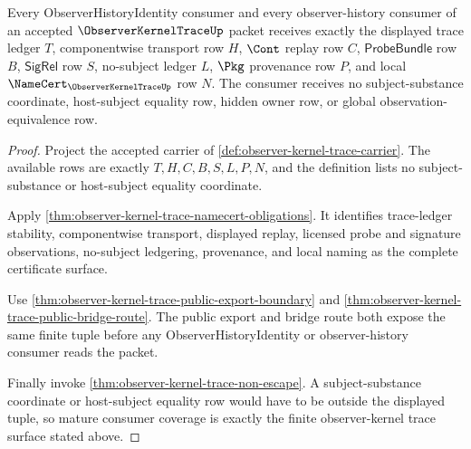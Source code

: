 \begin{theorem}
\label{thm:observer-kernel-trace-mature-consumer-coverage}
Every ObserverHistoryIdentity consumer and every observer-history consumer of an accepted $\ObserverKernelTraceUp$ packet receives exactly the displayed trace ledger $T$, componentwise transport row $H$, $\Cont$ replay row $C$, $\mathsf{ProbeBundle}$ row $B$, $\mathsf{SigRel}$ row $S$, no-subject ledger $L$, $\Pkg$ provenance row $P$, and local $\NameCert_{\ObserverKernelTraceUp}$ row $N$. The consumer receives no subject-substance coordinate, host-subject equality row, hidden owner row, or global observation-equivalence row.
\end{theorem}
\begin{proof}
Project the accepted carrier of \autoref{def:observer-kernel-trace-carrier}. The available rows are exactly $T,H,C,B,S,L,P,N$, and the definition lists no subject-substance or host-subject equality coordinate.

Apply \autoref{thm:observer-kernel-trace-namecert-obligations}. It identifies trace-ledger stability, componentwise transport, displayed replay, licensed probe and signature observations, no-subject ledgering, provenance, and local naming as the complete certificate surface.

Use \autoref{thm:observer-kernel-trace-public-export-boundary} and \autoref{thm:observer-kernel-trace-public-bridge-route}. The public export and bridge route both expose the same finite tuple before any ObserverHistoryIdentity or observer-history consumer reads the packet.

Finally invoke \autoref{thm:observer-kernel-trace-non-escape}. A subject-substance coordinate or host-subject equality row would have to be outside the displayed tuple, so mature consumer coverage is exactly the finite observer-kernel trace surface stated above.
\end{proof}



